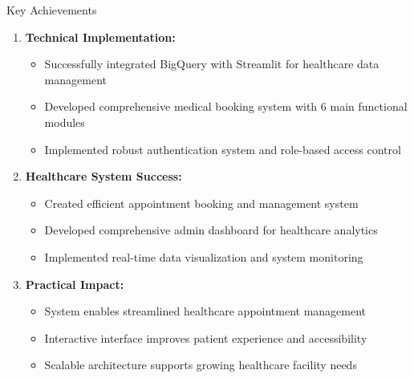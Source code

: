 \documentclass[aspectratio=169]{beamer}
\begin{document}
\begin{frame}{Key Achievements}
\begin{enumerate}
    \item \textbf{Technical Implementation:}
    \begin{itemize}
        \item Successfully integrated BigQuery with Streamlit for healthcare data management
        \item Developed comprehensive medical booking system with 6 main functional modules
        \item Implemented robust authentication system and role-based access control
    \end{itemize}
    
    \item \textbf{Healthcare System Success:}
    \begin{itemize}
        \item Created efficient appointment booking and management system
        \item Developed comprehensive admin dashboard for healthcare analytics
        \item Implemented real-time data visualization and system monitoring
    \end{itemize}
    
    \item \textbf{Practical Impact:}
    \begin{itemize}
        \item System enables streamlined healthcare appointment management
        \item Interactive interface improves patient experience and accessibility
        \item Scalable architecture supports growing healthcare facility needs
    \end{itemize}
\end{enumerate}
\end{frame}
\end{document}
